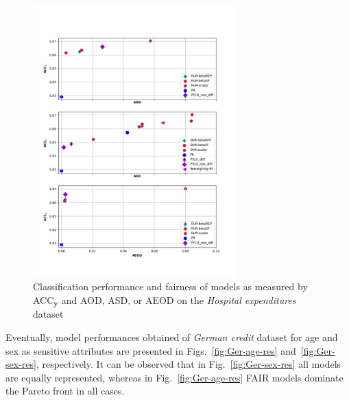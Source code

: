 \documentclass[preprint,12pt]{elsarticle}
\begin{document}
\begin{figure}
	\center
	\includegraphics[angle=0, width=0.7\textwidth]{MEPS19_ACC.png}
	\captionsetup{justification=centering}
	\caption{Classification performance and fairness of models as measured by ACC$_\mathbf{y}$ and AOD, ASD, or AEOD on the \textit{Hospital expenditures} dataset}
	\label{fig:MEPS19}
	\vskip -0.2in
\end{figure}



Eventually, model performances obtained of \textit{German credit} dataset for age and sex as sensitive attributes are presented in Figs.~\ref{fig:Ger-age-res} and~\ref{fig:Ger-sex-res}, respectively. It can be observed that in  Fig.~\ref{fig:Ger-sex-res} all models are equally represented, whereas in  Fig.~\ref{fig:Ger-age-res} FAIR models dominate the Pareto front in all cases. 
\end{document}
